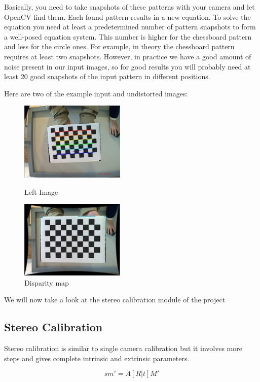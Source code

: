 \documentclass[11pt]{report}
\begin{document}
Basically, you need to take snapshots of these patterns with your camera and let OpenCV find them. Each found pattern results in a new equation. To solve the equation you need at least a predetermined number of pattern snapshots to form a well-posed equation system. This number is higher for the chessboard pattern and less for the circle ones. For example, in theory the chessboard pattern requires at least two snapshots. However, in practice we have a good amount of noise present in our input images, so for good results you will probably need at least 20 good snapshots of the input pattern in different positions.

Here are two of the example input and undistorted images:



\begin{figure}
\centering
\parbox{5cm}{
\includegraphics[width=5cm]{normal.jpg}
\caption{Left Image}
\label{fig:2figsA}}
\qquad
\begin{minipage}{5cm}
\includegraphics[width=5cm]{undist.jpg}
\caption{Disparity map}
\label{fig:2figsB}
\end{minipage}
\end{figure}

We will now take a look at the stereo calibration module of the project
\newpage
\subsection{Stereo Calibration}
Stereo calibration is similar to single camera calibration but it involves more steps and gives complete intrinsic and extrinsic parameters. 

\begin{equation}
sm' = A[R|t]M'
\end{equation}
\end{document}
